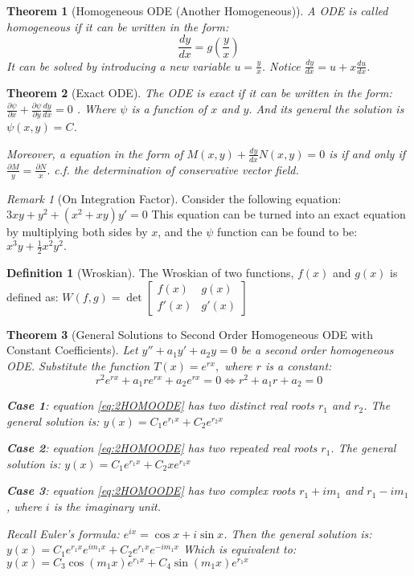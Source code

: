 \documentclass[9pt]{article}
\newtheorem{theorem}{Theorem}[subsection]
\theoremstyle{definition}
\newtheorem{definition}{Definition}[section]
\theoremstyle{remark}
\newtheorem{remark}{Remark}[section]
\begin{document}
\begin{theorem}[Homogeneous ODE (Another Homogeneous)]
A ODE is called homogeneous if it can be written in the form:
\[
	\frac{dy}{dx}  = g(\frac{y}{x})
\]
It can be solved by introducing a new variable $u = \frac{y}{x}$. Notice 
$ \frac{dy}{dx} = u + x \frac{du}{dx}$.
\end{theorem}

\begin{theorem}[Exact ODE]
	The ODE is exact if it can be written in the form:
$
	\frac{ \partial \psi}{ \partial x} + \frac{ \partial \psi}{ \partial y} \frac{dy}{dx} = 0
$
. Where $\psi$ is a function of $x$ and $y$.
And its general the solution is $ \psi (x,y) = C$.

Moreover, a equation in the form of $ M(x,y) + \frac{dy}{dx} N(x,y) = 0$ is if and only if $ \frac{ \partial M}{y} = \frac{ \partial N}{x}.$
c.f. the determination of conservative vector field.
\end{theorem}

\begin{remark}[On Integration Factor]
Consider the following equation:
$
	3xy+y^2 +(x^2+xy)y' = 0
$
This equation can be turned into an exact equation by multiplying both sides by $x$, and the $\psi$ function can be found to be: $x^3y+ \frac{1}{2}x^2y^2.$
\end{remark}

\begin{definition}[Wroskian]
	The Wroskian of two functions, $f(x)$ and $g(x)$ is defined as:
	$
		W(f,g) = \det \begin{bmatrix} f(x) & g(x) \\ f'(x) & g'(x) \end{bmatrix}
	$
\end{definition}

\begin{theorem}[General Solutions to Second Order Homogeneous ODE with Constant Coefficients] \label{SolutionSOODEConstant}
	Let $y'' + a_1y' +  a_2y = 0$ be a second order homogeneous ODE.
	Substitute the function $T(x) = e^{rx},$ where $r$ is a constant:
\begin{equation}\label{eq:2HOMOODE}
		r^2e^{rx} + a_1re^{rx} + a_2e^{rx} = 0 \iff r^2 + a_1r + a_2 = 0
\end{equation}

\textbf{Case 1}: equation \ref{eq:2HOMOODE} has two distinct real roots $r_1$ and $r_2$.
The general solution is: 
$
	y(x) = C_1e^{r_1x} + C_2e^{r_2x}
$

\textbf{Case 2}: equation \ref{eq:2HOMOODE} has two repeated real roots $r_1$.
The general solution is:
$
	y(x) = C_1e^{r_1x} + C_2x e^{r_1x}
$ 

\textbf{Case 3}: equation \ref{eq:2HOMOODE} has two complex roots $r_1+im_1$ and $r_1 - im_1$, where $i$ is the imaginary unit.

Recall Euler's formula: $e^{ix} = \cos x + i \sin x$.
Then the general solution is:
$ 
	y(x) = C_1e^{r_1x}e^{im_1x} + C_2e^{r_1x}e^{-im_1x}
$
Which is equivalent to:
$
	y(x) = C_3\cos(m_1x)e^{r_1x} + C_4\sin(m_1x)e^{r_1x}
$
\end{theorem}
\end{document}
